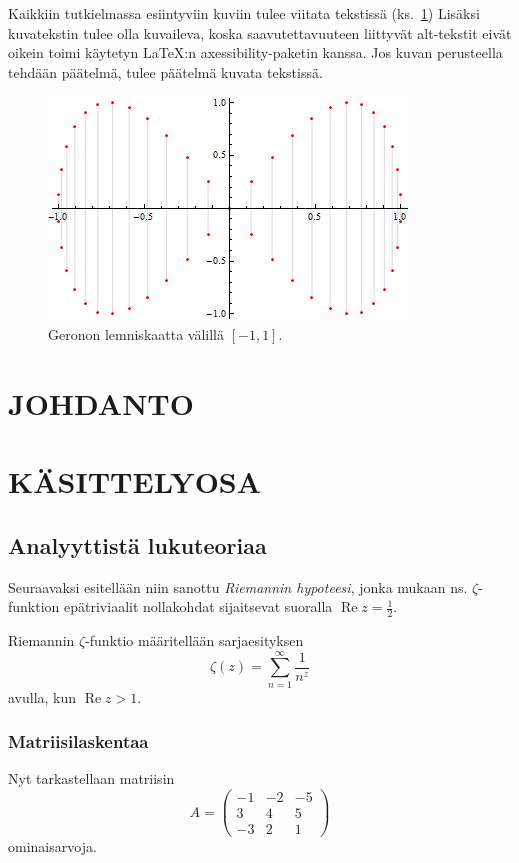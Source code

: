 Kaikkiin tutkielmassa esiintyviin kuviin tulee viitata tekstissä (ks.~\ref{kuvatus1}) Lisäksi kuvatekstin tulee olla kuvaileva, koska saavutettavuuteen liittyvät alt-tekstit eivät oikein toimi käytetyn \LaTeX :n axessibility-paketin kanssa. Jos kuvan perusteella tehdään päätelmä, tulee päätelmä kuvata tekstissä. 

\begin{figure}[ht]
\begin{center}
\includegraphics[width=.45\textwidth]{siivet.jpg}
\end{center}
\label{kuvatus1}
\caption{Geronon lemniskaatta välillä $[-1,1]$.}
\end{figure}


\section{JOHDANTO}
\lipsum[1-10]

\section{KÄSITTELYOSA}
\lipsum[1-10]

\subsection{Analyyttistä lukuteoriaa}

Seuraavaksi esitellään niin sanottu {\em Riemannin hypoteesi}, jonka mukaan ns. $\zeta$-funktion epätriviaalit nollakohdat sijaitsevat suoralla $\operatorname{Re}z=\frac12$.
\begin{definition} Riemannin $\zeta$-funktio määritellään sarjaesityksen \cite{Riemann}
\[
\zeta(z)=\sum_{n=1}^{\infty}\frac{1}{n^z}
\]
avulla, kun $\operatorname{Re}z>1$.
\end{definition}

\subsubsection{Matriisilaskentaa}

Nyt tarkastellaan matriisin
\[
A=\left(\begin{array}{rrr} -1 & -2 & -5\\ 3& 4& 5\\ -3 & 2 & 1 \end{array}\right)
\]
ominaisarvoja.



